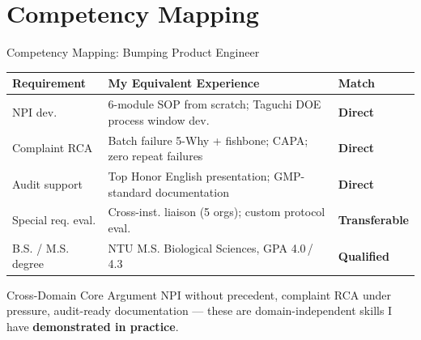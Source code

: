 \documentclass[aspectratio=169,10pt]{beamer}
\begin{document}
\section{Competency Mapping}
\begin{frame}{Competency Mapping: Bumping Product Engineer}
  \begin{center}
  \footnotesize
  \begin{tabular}{p{2.3cm}p{5.7cm}p{2.2cm}}
    \toprule
    \textbf{Requirement} & \textbf{My Equivalent Experience} & \textbf{Match} \\
    \midrule
    NPI dev. &
    6-module SOP from scratch; Taguchi DOE process window dev. &
    \textcolor{successgreen}{\textbf{Direct}} \\[2pt]
    Complaint RCA &
    Batch failure 5-Why + fishbone; CAPA; zero repeat failures &
    \textcolor{successgreen}{\textbf{Direct}} \\[2pt]
    Audit support &
    Top Honor English presentation; GMP-standard documentation &
    \textcolor{successgreen}{\textbf{Direct}} \\[2pt]
    Special req. eval. &
    Cross-inst. liaison (5 orgs); custom protocol eval. &
    \textcolor{successgreen}{\textbf{Transferable}} \\[2pt]
    B.S. / M.S. degree &
    NTU M.S. Biological Sciences, GPA 4.0\,/\,4.3 &
    \textcolor{successgreen}{\textbf{Qualified}} \\
    \bottomrule
  \end{tabular}
  \end{center}

  \vspace{0.08cm}
  \begin{alertblock}{Cross-Domain Core Argument}
    \small
    NPI without precedent, complaint RCA under pressure, audit-ready documentation ---
    these are domain-independent skills I have \textbf{demonstrated in practice}.
  \end{alertblock}
\end{frame}
\end{document}

